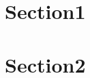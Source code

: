 \documentclass[twoside]{article}
\begin{document}
\begin{multicols*}{2}
    \tableofcontents
\end{multicols*}
\section{Section1}
\section{Section2}
\end{document}
